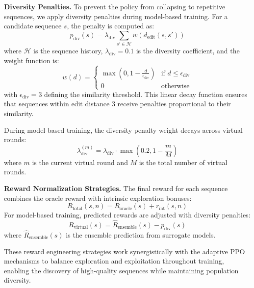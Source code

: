 \documentclass[conference]{IEEEtran}
\begin{document}
\textbf{Diversity Penalties.} To prevent the policy from collapsing to repetitive sequences, we apply diversity penalties during model-based training. For a candidate sequence $s$, the penalty is computed as:
%
\begin{equation}
p_{\text{div}}(s) = \lambda_{\text{div}} \sum_{s' \in \mathcal{H}} w(d_{\text{edit}}(s, s'))
\end{equation}
%
where $\mathcal{H}$ is the sequence history, $\lambda_{\text{div}} = 0.1$ is the diversity coefficient, and the weight function is:
%
\begin{equation}
w(d) = \begin{cases}
\max\left(0, 1 - \frac{d}{\epsilon_{\text{div}}}\right) & \text{if } d \leq \epsilon_{\text{div}} \\
0 & \text{otherwise}
\end{cases}
\end{equation}
%
with $\epsilon_{\text{div}} = 3$ defining the similarity threshold. This linear decay function ensures that sequences within edit distance 3 receive penalties proportional to their similarity.

During model-based training, the diversity penalty weight decays across virtual rounds:
%
\begin{equation}
\lambda_{\text{div}}^{(m)} = \lambda_{\text{div}} \cdot \max\left(0.2, 1 - \frac{m}{M}\right)
\end{equation}
%
where $m$ is the current virtual round and $M$ is the total number of virtual rounds.

\textbf{Reward Normalization Strategies.} The final reward for each sequence combines the oracle reward with intrinsic exploration bonuses:
%
\begin{equation}
R_{\text{total}}(s, n) = R_{\text{oracle}}(s) + r_{\text{int}}(s, n)
\end{equation}
%
For model-based training, predicted rewards are adjusted with diversity penalties:
%
\begin{equation}
R_{\text{virtual}}(s) = \hat{R}_{\text{ensemble}}(s) - p_{\text{div}}(s)
\end{equation}
%
where $\hat{R}_{\text{ensemble}}(s)$ is the ensemble prediction from surrogate models.

These reward engineering strategies work synergistically with the adaptive PPO mechanisms to balance exploration and exploitation throughout training, enabling the discovery of high-quality sequences while maintaining population diversity.
\end{document}
